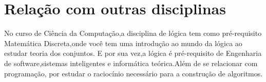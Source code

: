 \documentclass{article}
\begin{document}
\section{Relação com outras disciplinas}

No curso de Ciência da Computação,a disciplina de lógica tem como pré-requisito Matemática Discreta,onde você tem uma introdução ao mundo da lógica ao estudar teoria dos conjuntos. E por sua vez,a lógica é pré-requisito de Engenharia de software,sistemas inteligentes e informática teórica.Além de se relacionar com programação, por estudar o raciocínio necessário para a construção de algoritmos.
\citep{ufpe2019}


\end{document}

